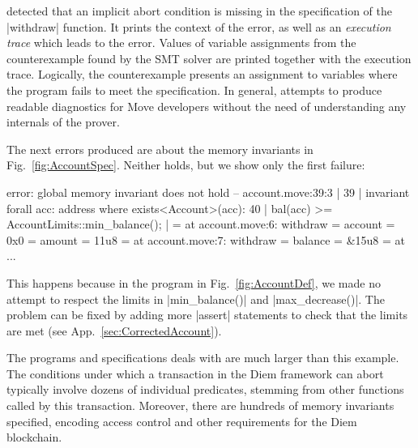 \noindent \MVP detected that an implicit abort condition is missing in the
specification of the |withdraw| function. It prints the context of the error, as
well as an \emph{execution trace} which leads to the error. Values of variable
assignments from the counterexample found by the SMT solver are printed together
with the execution trace. Logically, the counterexample presents an
assignment to variables where the program fails to meet the specification. In
general, \MVP attempts to produce readable diagnostics for Move developers
without the need of understanding any internals of the prover.

The next errors produced are about the memory invariants in
Fig.~\ref{fig:AccountSpec}. Neither holds, but
we show only the first failure:

\begin{MoveDiag}
error: global memory invariant does not hold
   -- account.move:39:3
   |
39 |    invariant forall acc: address where exists<Account>(acc):
40 |      bal(acc) >= AccountLimits::min_balance();
   |
   =     at account.move:6: withdraw
   =         account = 0x0
   =         amount = 11u8
   =     at account.move:7: withdraw
   =         balance = &15u8
   =     at ...
\end{MoveDiag}

\noindent This happens because in the program in Fig.~\ref{fig:AccountDef}, we
made no attempt to respect the limits in |min_balance()| and
|max_decrease()|.
The problem can be fixed by adding more |assert| statements to check that
the limits are met (see App.~\ref{sec:CorrectedAccount}).


The programs and specifications \MVP deals with are much larger than
this example. The conditions under which a transaction
in the Diem framework can abort typically involve dozens of individual predicates,
stemming from other functions called by this transaction. Moreover, there are
hundreds of memory invariants specified, encoding access control and other
requirements for the Diem blockchain.

